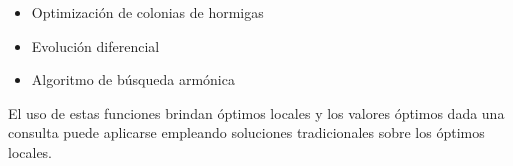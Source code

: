 \documentclass[
10pt, %
aspectratio=169, %
]{beamer}
\begin{document}
\begin{frame}
\begin{itemize}
			\item Optimización de colonias de hormigas
			
			\item Evolución diferencial
			
			\item Algoritmo de búsqueda armónica
		
		\end{itemize}
		
		\vspace{1.5\baselineskip}
		
		El uso de estas funciones brindan óptimos locales y los valores óptimos dada una consulta puede aplicarse empleando soluciones tradicionales sobre los óptimos locales. 
	\end{frame}
	
\end{document}
